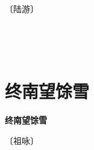 \documentclass[12pt,UTF-8,openany,fontset=none]{ctexbook}
\begin{document}
\begin{center}
    \vspace{10pt}
    
    \begin{large}
        
        〔陆游〕
        
    \end{large}
    
    \vspace{8pt}
    
    \begin{huge}
        
        \phantom{。}~~

        \phantom{。}~~
        
        \phantom{。}

        \phantom{。}
        
    \end{huge}
    
\end{center}

\vspace{8pt}
\clearpage


\section{终南望馀雪}



\begin{center}
    {\bfseries 终南望馀雪}
\end{center}

\begin{center}
    \vspace{10pt}
    
    \begin{large}
        
        〔祖咏〕
        
    \end{large}
    
    \vspace{8pt}
    
    \begin{huge}
        
        
        
        
        
    \end{huge}
    
\end{center}
\end{document}
